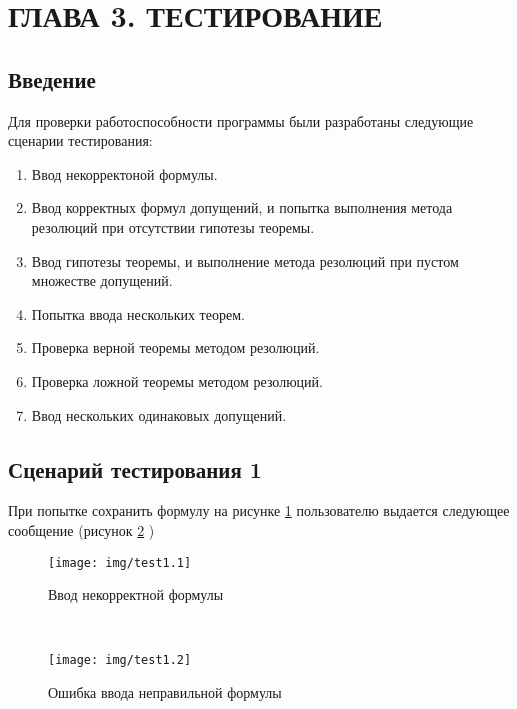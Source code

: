 \documentclass[12pt, a4paper]{article}
\begin{document}
 	 \section*{\centering ГЛАВА 3. ТЕСТИРОВАНИЕ}
	 \setcounter{section}{3}
	 \setcounter{subsection}{0}
	 \begin{center}
	 	\subsection{Введение}
	 \end{center} 
	 \par Для проверки работоспособности программы были разработаны следующие сценарии тестирования:
	 \begin{enumerate}
	 	 \item Ввод некорректоной формулы.
	 	 \item Ввод корректных формул допущений, и попытка выполнения метода резолюций при отсутствии гипотезы теоремы.
	 	 \item Ввод гипотезы теоремы, и выполнение метода резолюций при пустом множестве допущений. 
	 	 \item Попытка ввода нескольких теорем.
	 	 \item Проверка верной теоремы методом резолюций.
	 	 \item Проверка ложной теоремы методом резолюций.
	 	 \item Ввод нескольких одинаковых допущений.
	 \end{enumerate}
	 \begin{center}
	 	\subsection{Сценарий тестирования 1}
	 \end{center} 
	 \par При попытке сохранить формулу на рисунке \ref{fig:test1.1} пользователю выдается следующее сообщение (рисунок \ref{fig:test1.2} )
	 \begin{figure}[h!]
	 	\centering
	 	\texttt{[image: img/test1.1]}
	 	\caption{Ввод некорректной формулы}
	 	\label{fig:test1.1}
	 \end{figure}\\
	 \begin{figure}[h!]
	 	\centering
	 	\texttt{[image: img/test1.2]}
	 	\caption{Ошибка ввода неправильной формулы}
	 	\label{fig:test1.2}
	 \end{figure}\\
\end{document}
